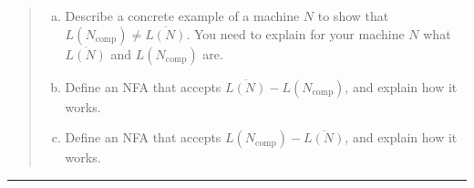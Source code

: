\documentclass[11pt]{article}
\newcommand{\comp}[1]{#1_{\text{comp}}}
\begin{document}



\begin{quote}
\begin{enumerate}[(a)]
\item Describe a concrete example of a machine $N$
 to show that $L(\comp{N}) \neq \overline{L(N)}$. You need
 to explain for your machine $N$ what $\overline{L(N)}$ and
 $L(\comp{N})$ are.

\item
Define an NFA that accepts 
$\overline{L(N)} - L(\comp{N})$, and explain how it works.

\item
Define an NFA that accepts 
$L(\comp{N}) - \overline{L(N)}$, and explain how it works.

\end{enumerate}
\end{quote}
\hrule
\end{document}
